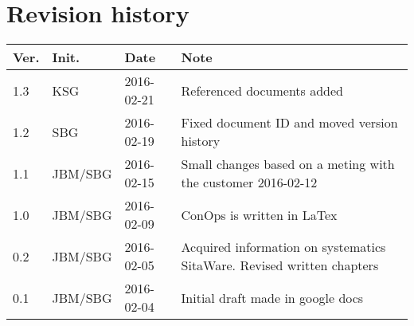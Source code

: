 \chapter*{Revision history}
\label{app:rev_his}

\renewcommand\arraystretch{1.5}
\begin{tabular}{b{1cm} b{2cm} b{2cm} b{7cm}}
    \textbf{Ver.} & \textbf{Init.} & \textbf{Date} & \textbf{Note} \\
    \hline 
    1.3  & KSG		& 2016-02-21 & Referenced documents added\\
    \hline
    1.2  & SBG		& 2016-02-19 & Fixed document ID and moved version history\\
    \hline
    1.1  & JBM/SBG	& 2016-02-15 & Small changes based on a meting with the customer 2016-02-12\\
    \hline
    1.0  & JBM/SBG	& 2016-02-09 & ConOps is written in LaTex \\
    \hline
    0.2  & JBM/SBG	& 2016-02-05 & Acquired information on systematics SitaWare. Revised written chapters \\
    \hline
    0.1  & JBM/SBG	& 2016-02-04 & Initial draft made in google docs \\
\end{tabular}
\renewcommand\arraystretch{1}